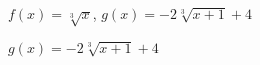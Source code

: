 {$f(x) = \sqrt[3]{x}$, $g(x) = -2\sqrt[3]{x + 1} + 4$ }
{$g(x) = -2\sqrt[3]{x + 1} + 4$\\
\begin{center}
\end{center}}



